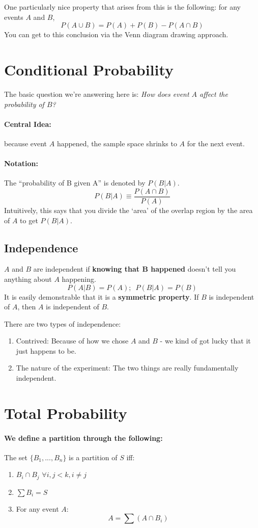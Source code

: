 \documentclass[a4paper,12pt]{report}
\begin{document}
One particularly nice property that arises from this is the following: for any events $A$ and $B$,
$$P(A \cup B) = P(A) + P(B) - P(A \cap B)$$
You can get to this conclusion via the Venn diagram drawing approach.

\section{Conditional Probability}
The basic question we're answering here is: \textit{How does event $A$ affect the probability of $B$?} 
\paragraph{Central Idea: } because event $A$ happened, the sample space shrinks to $A$ for the next event.

\paragraph{Notation: } The ``probability of B given A'' is denoted by $P(B|A)$.
$$P(B|A) \equiv \frac{P(A \cap B)}{P(A)}$$
Intuitively, this says that you divide the `area' of the overlap region by the area of $A$ to get $P(B|A)$. 

\subsection{Independence}

$A$ and $B$ are independent if \textbf{knowing that B happened} doesn't tell you anything about $A$ happening. 
$$P(A|B) = P(A);\,\,\, P(B|A) = P(B)$$
It is easily demonstrable that it is a \textbf{symmetric property}. If $B$ is independent of $A$, then $A$ is 
independent of $B$.

There are two types of independence:
\begin{enumerate}
\item Contrived: Because of how we chose $A$ and $B$ - we kind of got lucky that it just happens to be.
\item The nature of the experiment: The two things are really fundamentally independent.
\end{enumerate}

\section{Total Probability}
\paragraph{We define a partition through the following: } The set $\{B_1, ..., B_n\}$ is a partition of $S$ 
iff:
\begin{enumerate}
\item $B_i \cap B_j\,\, \forall i, j < k, i \neq j$
\item $\sum B_i = S$
\item For any event $A$: $$A = \sum(A \cap B_i)$$
\end{enumerate}
\end{document}
